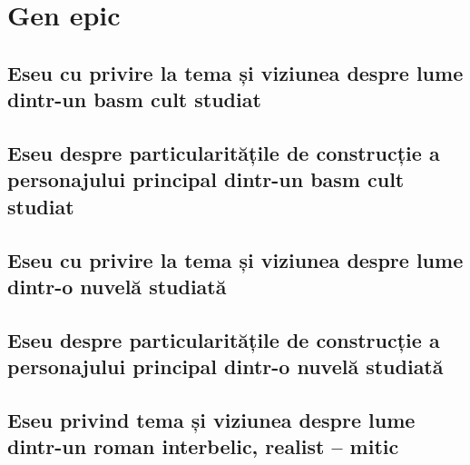 \documentclass{eseuri_bac_romana}
\begin{document}
\maketitle %
\CustomToC %


\part{Gen epic}


\chapter{Eseu cu privire la tema și viziunea despre lume dintr-un basm cult studiat}


\chapter{Eseu despre particularitățile de construcție a personajului principal dintr-un basm cult studiat}



\chapter{Eseu cu privire la tema și viziunea despre lume dintr-o nuvelă studiată}


\chapter{Eseu despre particularitățile de construcție a personajului principal dintr-o nuvelă studiată}



\chapter{Eseu privind tema și viziunea despre lume dintr-un roman interbelic, realist -- mitic}

\end{document}
